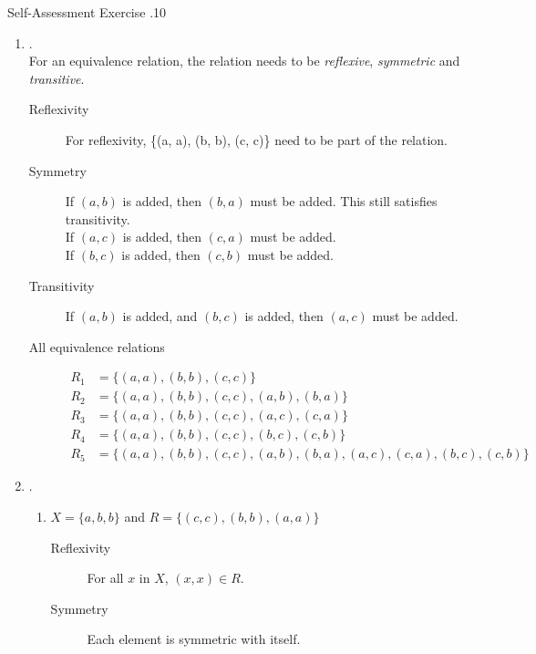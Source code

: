 \documentclass[../notes.tex]{subfiles}
\begin{document}
				\begin{exercise}{Self-Assessment Exercise \thechapter.10}
					\begin{enumerate}
						\item {}.\\
							For an equivalence relation, the relation needs to be \textit{reflexive}, \textit{symmetric} and \textit{transitive}.
							\begin{description}
								\item[Reflexivity] For reflexivity, \{(a, a), (b, b), (c, c)\} need to be part of the relation.
								\item[Symmetry] If $(a, b)$ is added, then $(b, a)$ must be added. This still satisfies transitivity.\\
								If $(a, c)$ is added, then $(c, a)$ must be added.\\
								If $(b, c)$ is added, then $(c, b)$ must be added.
								\item[Transitivity] If $(a, b)$ is added, and $(b, c)$ is added, then $(a, c)$ must be added.
								\item[All equivalence relations]
									\begin{align*}
										R_{1} &= \bigl\{(a, a), (b, b), (c, c)\bigr\}\\
										R_{2} &= \bigl\{(a, a), (b, b), (c, c), (a, b), (b, a)\bigr\}\\
										R_{3} &= \bigl\{(a, a), (b, b), (c, c), (a, c), (c, a)\bigr\}\\
										R_{4} &= \bigl\{(a, a), (b, b), (c, c), (b, c), (c, b)\bigr\}\\
										R_{5} &= \bigl\{(a, a), (b, b), (c, c), (a, b), (b, a), (a, c), (c, a), (b, c), (c, b)\bigr\}
									\end{align*} 
							\end{description}
						\item {}.
							\begin{enumerate}[label=(\alph*)]
								\item $X = \{a, b, b\}$ and $R = \bigl\{(c, c), (b, b), (a, a)\bigr\}$
									\begin{description}
										\item[Reflexivity] For all $x$ in $X$, $(x, x) \in R$.
										\item[Symmetry] Each element is symmetric with itself.

\end{description}
\end{enumerate}
\end{enumerate}
\end{exercise}
\end{document}
